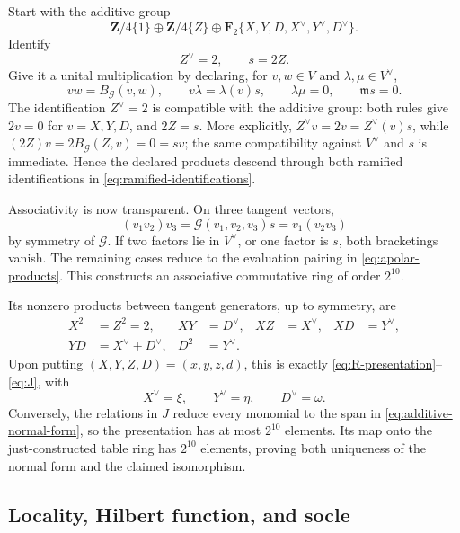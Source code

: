 \documentclass[11pt]{article}
\theoremstyle{remark}
\newcommand{\F}{\mathbf F}
\newcommand{\Z}{\mathbf Z}
\newcommand{\m}{\mathfrak m}
\begin{document}
Start with the additive group
\begin{equation}\label{eq:apolar-additive}
 \Z/4\{1\}\oplus\Z/4\{Z\}
 \oplus\F_2\{X,Y,D,X^\vee,Y^\vee,D^\vee\}.
\end{equation}
Identify
\begin{equation}\label{eq:ramified-identifications}
 Z^\vee=2,\qquad s=2Z.
\end{equation}
Give it a unital multiplication by declaring, for \(v,w\in V\) and
\(\lambda,\mu\in V^\vee\),
\begin{equation}\label{eq:apolar-products}
 vw=B_{\mathcal G}(v,w),\qquad
 v\lambda=\lambda(v)s,\qquad
 \lambda\mu=0,\qquad \m s=0.
\end{equation}
The identification \(Z^\vee=2\) is compatible with the additive group:
both rules give \(2v=0\) for \(v=X,Y,D\), and \(2Z=s\).
More explicitly, \(Z^\vee v=2v=Z^\vee(v)s\), while
\((2Z)v=2B_{\mathcal G}(Z,v)=0=sv\); the same compatibility against
\(V^\vee\) and \(s\) is immediate.  Hence the declared products descend
through both ramified identifications in \eqref{eq:ramified-identifications}.

Associativity is now transparent.  On three tangent vectors,
\[
 (v_1v_2)v_3=\mathcal G(v_1,v_2,v_3)s
             =v_1(v_2v_3)
\]
by symmetry of \(\mathcal G\).  If two factors lie in \(V^\vee\), or one
factor is \(s\), both bracketings vanish.  The remaining cases reduce to the
evaluation pairing in \eqref{eq:apolar-products}.  This constructs an
associative commutative ring of order \(2^{10}\).

Its nonzero products between tangent generators, up to symmetry, are
\begin{equation}\label{eq:tangent-products}
\begin{aligned}
 X^2&=Z^2=2,& XY&=D^\vee,& XZ&=X^\vee,& XD&=Y^\vee,\\
 YD&=X^\vee+D^\vee,& D^2&=Y^\vee.&&
\end{aligned}
\end{equation}
Upon putting \((X,Y,Z,D)=(x,y,z,d)\), this is exactly
\eqref{eq:R-presentation}--\eqref{eq:J}, with
\[
 X^\vee=\xi,\qquad Y^\vee=\eta,\qquad D^\vee=\omega.
\]
Conversely, the relations in \(J\) reduce every monomial to the span in
\eqref{eq:additive-normal-form}, so the presentation has at most \(2^{10}\)
elements.  Its map onto the just-constructed table ring has \(2^{10}\)
elements, proving both uniqueness of the normal form and the claimed
isomorphism.

\subsection{Locality, Hilbert function, and socle}
\end{document}

